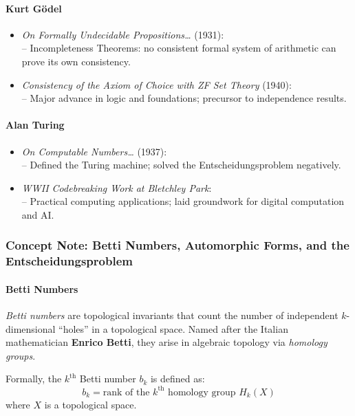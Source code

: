 \documentclass[9pt]{article}
\begin{document}
\paragraph{Kurt Gödel}
\begin{itemize}
  \item \textit{On Formally Undecidable Propositions\dots} (1931): \\
  \quad– Incompleteness Theorems: no consistent formal system of arithmetic can prove its own consistency.
  \item \textit{Consistency of the Axiom of Choice with ZF Set Theory} (1940): \\
  \quad– Major advance in logic and foundations; precursor to independence results.
\end{itemize}

\paragraph{Alan Turing}
\begin{itemize}
  \item \textit{On Computable Numbers\dots} (1937): \\
  \quad– Defined the Turing machine; solved the Entscheidungsproblem negatively.
  \item \textit{WWII Codebreaking Work at Bletchley Park}: \\
  \quad– Practical computing applications; laid groundwork for digital computation and AI.
\end{itemize}

\newpage


\subsubsection*{Concept Note: Betti Numbers, Automorphic Forms, and the Entscheidungsproblem}


\paragraph{Betti Numbers}
\textit{Betti numbers} are topological invariants that count the number of independent $k$-dimensional ``holes'' in a topological space. Named after the Italian mathematician \textbf{Enrico Betti}, they arise in algebraic topology via \textit{homology groups}.

\medskip

\noindent Formally, the $k^\text{th}$ Betti number $b_k$ is defined as:
\[
b_k = \text{rank of the } k^\text{th} \text{ homology group } H_k(X)
\]
where $X$ is a topological space.
\end{document}
